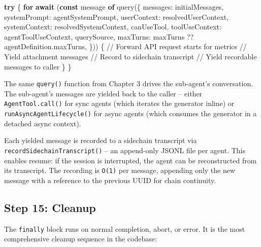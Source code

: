 \documentclass[
  english,
  11pt,
  letterpaper,
]{book}
\newenvironment{Shaded}{\begin{snugshade}}{\end{snugshade}}
\newcommand{\AttributeTok}[1]{\textcolor[rgb]{0.40,0.45,0.13}{#1}}
\newcommand{\CommentTok}[1]{\textcolor[rgb]{0.37,0.37,0.37}{#1}}
\newcommand{\ControlFlowTok}[1]{\textcolor[rgb]{0.00,0.23,0.31}{\textbf{#1}}}
\newcommand{\FunctionTok}[1]{\textcolor[rgb]{0.28,0.35,0.67}{#1}}
\newcommand{\KeywordTok}[1]{\textcolor[rgb]{0.00,0.23,0.31}{\textbf{#1}}}
\newcommand{\NormalTok}[1]{\textcolor[rgb]{0.00,0.23,0.31}{#1}}
\newcommand{\OperatorTok}[1]{\textcolor[rgb]{0.37,0.37,0.37}{#1}}
\begin{document}
\begin{Shaded}
\begin{Highlighting}[]
\ControlFlowTok{try}\NormalTok{ \{}
  \ControlFlowTok{for} \ControlFlowTok{await}\NormalTok{ (}\KeywordTok{const}\NormalTok{ message }\KeywordTok{of} \FunctionTok{query}\NormalTok{(\{}
\NormalTok{    messages}\OperatorTok{:}\NormalTok{ initialMessages}\OperatorTok{,}
\NormalTok{    systemPrompt}\OperatorTok{:}\NormalTok{ agentSystemPrompt}\OperatorTok{,}
\NormalTok{    userContext}\OperatorTok{:}\NormalTok{ resolvedUserContext}\OperatorTok{,}
\NormalTok{    systemContext}\OperatorTok{:}\NormalTok{ resolvedSystemContext}\OperatorTok{,}
\NormalTok{    canUseTool}\OperatorTok{,}
\NormalTok{    toolUseContext}\OperatorTok{:}\NormalTok{ agentToolUseContext}\OperatorTok{,}
\NormalTok{    querySource}\OperatorTok{,}
\NormalTok{    maxTurns}\OperatorTok{:}\NormalTok{ maxTurns }\OperatorTok{??}\NormalTok{ agentDefinition}\OperatorTok{.}\AttributeTok{maxTurns}\OperatorTok{,}
\NormalTok{  \})) \{}
    \CommentTok{// Forward API request starts for metrics}
    \CommentTok{// Yield attachment messages}
    \CommentTok{// Record to sidechain transcript}
    \CommentTok{// Yield recordable messages to caller}
\NormalTok{  \}}
\NormalTok{\}}
\end{Highlighting}
\end{Shaded}

The same \texttt{query()} function from Chapter 3 drives the sub-agent's
conversation. The sub-agent's messages are yielded back to the caller --
either \texttt{AgentTool.call()} for sync agents (which iterates the
generator inline) or \texttt{runAsyncAgentLifecycle()} for async agents
(which consumes the generator in a detached async context).

Each yielded message is recorded to a sidechain transcript via
\texttt{recordSidechainTranscript()} -- an append-only JSONL file per
agent. This enables resume: if the session is interrupted, the agent can
be reconstructed from its transcript. The recording is \texttt{O(1)} per
message, appending only the new message with a reference to the previous
UUID for chain continuity.

\subsection{Step 15: Cleanup}\label{step-15-cleanup}

The \texttt{finally} block runs on normal completion, abort, or error.
It is the most comprehensive cleanup sequence in the codebase:
\end{document}
